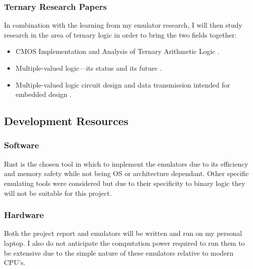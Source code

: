 \documentclass{article}
\begin{document}
\subsubsection{Ternary Research Papers}

In combination with the learning from my emulator research, I will then study research in the area of ternary 
logic in order to bring the two fields together:

\begin{itemize}
  \item CMOS Implementation and Analysis of Ternary Arithmetic Logic \citep{duret2019ternaryALU}.
  \item Multiple-valued logic—its status and its future \citep{hurst1984mvl}.
  \item Multiple-valued logic circuit design and data transmission intended for embedded design \citep{jaber2020mvl}.
\end{itemize}

\subsection{Development Resources}

\subsubsection{Software}

Rust is the chosen tool in which to implement the emulators due to its efficiency and memory safety while not being OS or 
architecture dependant. Other specific emulating tools were considered but due to their specificity to binary logic they will not 
be suitable for this project.

\subsubsection{Hardware}

Both the project report and emulators will be written and run on my personal laptop. I also do not anticipate 
the computation power required to run them to be extensive due to the simple nature of these emulators 
relative to modern CPU's.

\newpage


\end{document}
